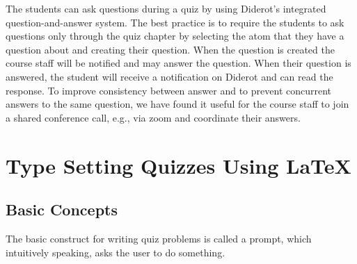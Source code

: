 \begin{cluster}
\label{grp:grm:quiz::students}

\begin{gram}
\label{grm:quiz::students}
The students can ask questions during a quiz by using Diderot's
integrated question-and-answer system.
The best practice is to require the students to ask questions only
through the quiz chapter by selecting the atom that they have a
question about and creating their question.
When the question is created the course staff will be notified and may answer the question. 
When their question is answered, the student will receive a notification on Diderot and can read the response.
To improve consistency between answer and to prevent concurrent answers to the same question, we have found it useful for the course staff to join a shared conference call, e.g., via zoom and coordinate their answers. 

\end{gram}
\end{cluster}


\section{Type Setting Quizzes Using LaTeX}
\label{ch:quiz::typesetting}


\subsection{Basic Concepts}
\label{sec:quiz::basic-concepts}

\begin{cluster}
\label{grp:grm:quiz::construct}

\begin{gram}
\label{grm:quiz::construct}
The basic construct for writing quiz problems is called a  prompt, which intuitively speaking, asks the user to do something.

\end{gram}
\end{cluster}

